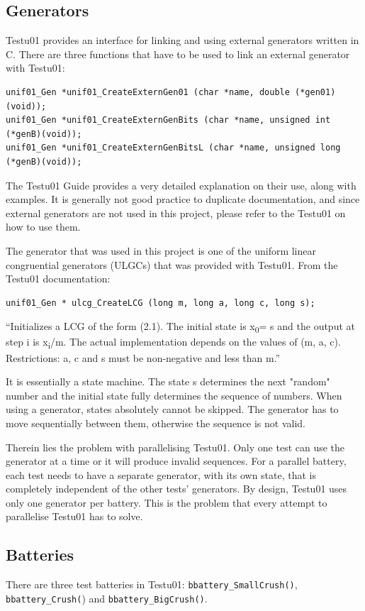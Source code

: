 \subsection{Generators}
Testu01 provides an interface for linking and using external generators written in C.
There are three functions that have to be used to link an external generator with Testu01:
\begin{verbatim}
unif01_Gen *unif01_CreateExternGen01 (char *name, double (*gen01)(void));
unif01_Gen *unif01_CreateExternGenBits (char *name, unsigned int (*genB)(void));
unif01_Gen *unif01_CreateExternGenBitsL (char *name, unsigned long (*genB)(void));
\end{verbatim}

The Testu01 Guide provides a very detailed explanation on their use, along with examples. It is generally not good practice to duplicate documentation, and since external generators are not used in this project, please refer to the Testu01 on how to use them.

The generator that was used in this project is one of the uniform linear congruential generators (ULGCs) that was provided with Testu01.
From the Testu01 documentation\cite{testu01guide-p25}:
\begin{verbatim}
unif01_Gen * ulcg_CreateLCG (long m, long a, long c, long s);
\end{verbatim}

``Initializes a LCG of the form (2.1).
The initial state is x\textsubscript{0}= s and the output at step i is x\textsubscript{i}/m.
The actual implementation depends on the values of (m, a, c). Restrictions: a, c and s must be
non-negative and less than m.''

It is essentially a state machine. The state s determines the next "random" number and the initial state fully determines the sequence of numbers. When using a generator, states absolutely cannot be skipped. The generator has to move sequentially between them, otherwise the sequence is not valid.

Therein lies the problem with parallelising Testu01. Only one test can use the generator at a time or it will produce invalid sequences. For a parallel battery, each test needs to have a separate generator, with its own state, that is completely independent of the other tests' generators. By design, Testu01 uses only one generator per battery. This is the problem that every attempt to parallelise Testu01 has to solve.

\subsection{Batteries}
There are three test batteries in Testu01: \texttt{bbattery\_SmallCrush()}, \texttt{bbattery\_Crush(}) and \texttt{bbattery\_BigCrush()}.

